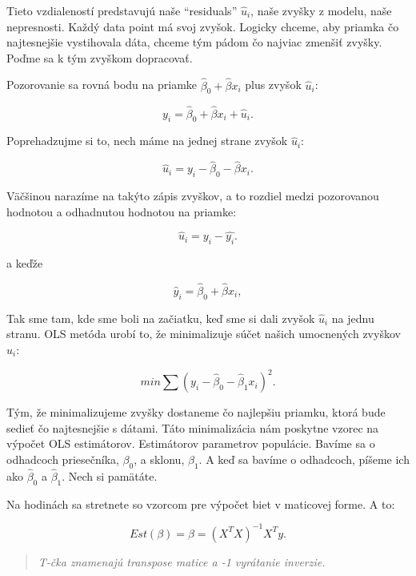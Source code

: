 \documentclass[]{article}
\begin{document}
Tieto vzdialeností predstavujú naše ``residuals'' \(\hat{u}_i\), naše
zvyšky z modelu, naše nepresnosti. Každý data point má svoj zvyšok.
Logicky chceme, aby priamka čo najtesnejšie vystihovala dáta, chceme tým
pádom čo najviac zmenšiť zvyšky. Poďme sa k tým zvyškom dopracovať.

Pozorovanie sa rovná bodu na priamke \(\hat\beta_0 + \hat\beta{x}_i\)
plus zvyšok \(\hat{u}_i\):

\[ y_i = \hat\beta_0 + \hat\beta{x}_i + \hat{u}_i.\]

\begin{center}

Poprehadzujme si to, nech máme na jednej strane zvyšok \(\hat{u}_i\):

\end{center}

\[ \hat{u}_i = y_i - \hat\beta_0 - \hat\beta{x}_i.\]

Väčšinou narazíme na takýto zápis zvyškov, a to rozdiel medzi
pozorovanou hodnotou a odhadnutou hodnotou na priamke:

\[\hat{u}_i = y_i - \hat{y_i}.\]

\begin{center}

a keďže

\end{center}

\[ \hat{y}_i =\hat\beta_0 + \hat\beta{x}_i,\]

Tak sme tam, kde sme boli na začiatku, keď sme si dali zvyšok
\(\hat{u}_i\) na jednu stranu. OLS metóda urobí to, že minimalizuje
súčet našich umocnených zvyškov \(\hat{u}_i\):

\[min\sum (y_i - \hat\beta_0 - \hat\beta_1{x}_i)^2.\]

Tým, že minimalizujeme zvyšky dostaneme čo najlepšiu priamku, ktorá bude
sedieť čo najtesnejšie s dátami. Táto minimalizácia nám poskytne vzorec
na výpočet OLS estimátorov. Estimátorov parametrov populácie. Bavíme sa
o odhadcoch priesečníka, \(\beta_0\), a sklonu, \(\beta_1\). A keď sa
bavíme o odhadcoch, píšeme ich ako \(\hat\beta_0\) a \(\hat\beta_1\).
Nech si pamätáte.

Na hodinách sa stretnete so vzorcom pre výpočet biet v maticovej forme.
A to:

\[Est(\beta) = \hat\beta = (X^TX)^{-1}X^Ty.\]

\begin{quote}
\emph{T-čka znamenajú transpose matice a -1 vyrátanie inverzie.}
\end{quote}
\end{document}
